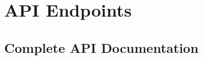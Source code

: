\appendix

\chapter{API Endpoints}
\label{app:api-endpoints}

\section{Complete API Documentation}

